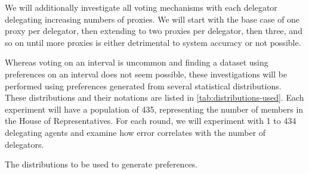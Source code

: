 We will additionally investigate all voting mechanisms with each delegator delegating
increasing numbers of proxies.
We will start with the base case of one proxy per delegator, then extending to two
proxies per delegator, then three, and so on until more proxies is either detrimental
to system accuracy or not possible.

Whereas voting on an interval is uncommon and finding a dataset using preferences
on an interval does not seem possible, these investigations will be performed using
preferences generated from several statistical distributions.
These distributions and their notations are listed in \autoref{tab:distributions-used}.
Each experiment will have a population of 435, representing the number of members in
the House of Representatives.
For each round, we will experiment with 1 to 434 delegating agents and examine how
error correlates with the number of delegators.

\begin{table}[!htbp]
    \renewcommand{\arraystretch}{1.3}

    \caption{The distributions to be used to generate preferences.}
    \label{tab:distributions-used}

    \centering
    
\end{table}

